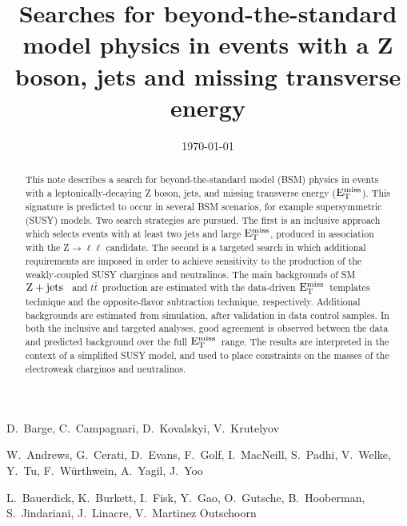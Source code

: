 \documentclass{cmspaper}
\newcommand{\zjets}{$\rm{Z}+\rm{jets}$ }
\newcommand{\ttbar}{\ensuremath{t\bar{t}}}
\newcommand{\MET}{\ensuremath{\rm{E_{T}^{miss}}}}
\begin{document}

\begin{titlepage}


  \date{\today}
 
  \title{Searches for beyond-the-standard model physics in events with a Z boson, jets and missing transverse energy}

  \begin{Authlist}
    D.~Barge, C.~Campagnari, D.~Kovalskyi, V.~Krutelyov

    W.~Andrews, G.~Cerati, D.~Evans, F.~Golf, I.~MacNeill, S.~Padhi, V.~Welke, Y.~Tu, F.~W\"urthwein, 
	A.~Yagil, J.~Yoo

	L.~Bauerdick, K.~Burkett, I.~Fisk, Y.~Gao, O.~Gutsche, B.~Hooberman, S.~Jindariani, J.~Linacre, V.~Martinez Outschoorn
  \end{Authlist}

  \begin{abstract}

This note describes a search for beyond-the-standard model (BSM) physics in events with a leptonically-decaying Z boson, 
jets, and missing transverse energy (\MET).
This signature is predicted to occur in several BSM scenarios, for example supersymmetric (SUSY) models.
Two search strategies are pursued. The first is an inclusive approach which selects events with at least two jets and
large \MET, produced in association with the Z$\to\ell\ell$ candidate. The second is a targeted search 
in which additional requirements are imposed in order to achieve sensitivity to the production of the weakly-coupled
SUSY charginos and neutralinos. The main backgrounds of SM \zjets\ and \ttbar\ production are estimated with the data-driven 
\MET\ templates technique and the opposite-flavor subtraction technique, respectively.
Additional backgrounds are estimated from simulation, after validation in data control samples. 
In both the inclusive and targeted analyses,  good agreement is observed between the data and predicted background over the full \MET\ range. 
The results are interpreted in the context of a simplified SUSY model, and used to place constraints on the masses of the electroweak
charginos and neutralinos.

\end{abstract}

\end{titlepage}
\end{document}
